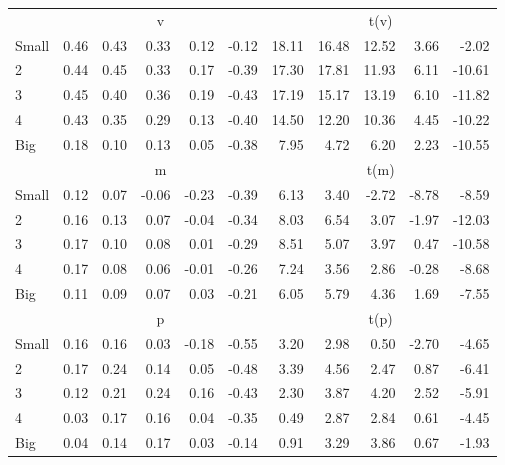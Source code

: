 \begin{table}[!ht]
\begin{tabular}{lrrrrrrrrrr}
  
     & \multicolumn{5}{c}{v} & \multicolumn{5}{c}{t(v)}   \\
     \cmidrule(r){2-6} \cmidrule(r){7-11} 
    Small  & 0.46  & 0.43  & 0.33  & 0.12  & -0.12  & 18.11  & 16.48  & 12.52  & 3.66  & -2.02   \\
    2  & 0.44  & 0.45  & 0.33  & 0.17  & -0.39  & 17.30  & 17.81  & 11.93  & 6.11  & -10.61   \\
    3  & 0.45  & 0.40  & 0.36  & 0.19  & -0.43  & 17.19  & 15.17  & 13.19  & 6.10  & -11.82   \\
    4  & 0.43  & 0.35  & 0.29  & 0.13  & -0.40  & 14.50  & 12.20  & 10.36  & 4.45  & -10.22   \\
    Big  & 0.18  & 0.10  & 0.13  & 0.05  & -0.38  & 7.95  & 4.72  & 6.20  & 2.23  & -10.55   \\
    
  
     & \multicolumn{5}{c}{m} & \multicolumn{5}{c}{t(m)}   \\
     \cmidrule(r){2-6} \cmidrule(r){7-11} 
    Small  & 0.12  & 0.07  & -0.06  & -0.23  & -0.39  & 6.13  & 3.40  & -2.72  & -8.78  & -8.59   \\
    2  & 0.16  & 0.13  & 0.07  & -0.04  & -0.34  & 8.03  & 6.54  & 3.07  & -1.97  & -12.03   \\
    3  & 0.17  & 0.10  & 0.08  & 0.01  & -0.29  & 8.51  & 5.07  & 3.97  & 0.47  & -10.58   \\
    4  & 0.17  & 0.08  & 0.06  & -0.01  & -0.26  & 7.24  & 3.56  & 2.86  & -0.28  & -8.68   \\
    Big  & 0.11  & 0.09  & 0.07  & 0.03  & -0.21  & 6.05  & 5.79  & 4.36  & 1.69  & -7.55   \\
    
  
     & \multicolumn{5}{c}{p} & \multicolumn{5}{c}{t(p)}   \\
     \cmidrule(r){2-6} \cmidrule(r){7-11} 
    Small  & 0.16  & 0.16  & 0.03  & -0.18  & -0.55  & 3.20  & 2.98  & 0.50  & -2.70  & -4.65   \\
    2  & 0.17  & 0.24  & 0.14  & 0.05  & -0.48  & 3.39  & 4.56  & 2.47  & 0.87  & -6.41   \\
    3  & 0.12  & 0.21  & 0.24  & 0.16  & -0.43  & 2.30  & 3.87  & 4.20  & 2.52  & -5.91   \\
    4  & 0.03  & 0.17  & 0.16  & 0.04  & -0.35  & 0.49  & 2.87  & 2.84  & 0.61  & -4.45   \\
    Big  & 0.04  & 0.14  & 0.17  & 0.03  & -0.14  & 0.91  & 3.29  & 3.86  & 0.67  & -1.93   \\
    
  
  \bottomrule
\end{tabular}
\label{tbl:25_Size_RVar_B16}
\end{table}